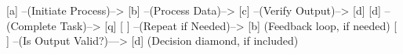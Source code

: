 [a] --(Initiate Process)--> [b] --(Process Data)--> [c] --(Verify Output)--> [d]  
[d] --(Complete Task)--> [q]  
[   ] --(Repeat if Needed)--> [b]  (Feedback loop, if needed)  
[   ] --(Is Output Valid?)---> [d] (Decision diamond, if included)